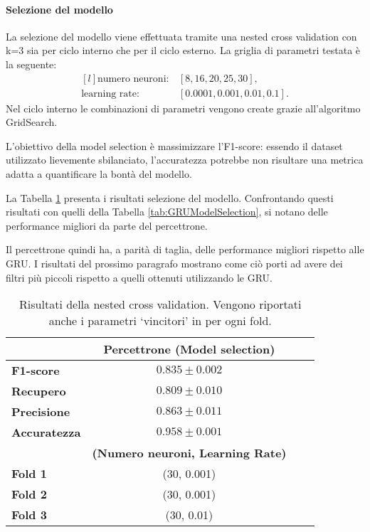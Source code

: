 \documentclass[../../main.tex]{subfiles}
\begin{document}
    \paragraph{Selezione del modello}

    La selezione del modello viene effettuata tramite una nested cross validation con k=3 sia per ciclo interno che per il ciclo esterno. La griglia di parametri testata è la seguente:
    \[
    \begin{matrix*}[l]
        \text{numero neuroni}: & [8, 16, 20, 25, 30],\\
        \text{learning rate}: & [0.0001, 0.001, 0.01, 0.1].
    \end{matrix*}
    \]
    Nel ciclo interno le combinazioni di parametri vengono create grazie all'algoritmo GridSearch.

    L'obiettivo della model selection è massimizzare l'F1-score: essendo il dataset utilizzato lievemente sbilanciato, l'accuratezza potrebbe non risultare una metrica adatta a quantificare la bontà del modello.
    
    La Tabella \ref{tab:modelSelection} presenta i risultati selezione del modello. Confrontando questi risultati con quelli della Tabella \ref{tab:GRUModelSelection}, si notano delle performance migliori da parte del percettrone. 
    
    Il percettrone quindi ha, a parità di taglia, delle performance migliori rispetto alle GRU. I risultati del prossimo paragrafo mostrano come ciò porti ad avere dei filtri più piccoli rispetto a quelli ottenuti utilizzando le GRU.
    \begin{table}[H]
        \centering                  
        \begin{tabular}{lccc}
            \toprule
            {}  &   \textbf{Percettrone (Model selection)}\\
            \midrule
            \textbf{F1-score }      &    $0.835 \pm 0.002$ \\
            \textbf{Recupero   }    &    $0.809 \pm 0.010$ \\
            \textbf{Precisione }    &    $0.863 \pm 0.011$ \\
            \textbf{Accuratezza }   &    $0.958 \pm 0.001$ \\
            \midrule
            {} & \textbf{(Numero neuroni, Learning Rate)}\\
            \midrule
            \textbf{Fold 1} &   (30, 0.001)\\ 
            \textbf{Fold 2} &   (30, 0.001)\\
            \textbf{Fold 3} &   (30, 0.01)\\
            \bottomrule
        \end{tabular}
        \caption{Risultati della nested cross validation. Vengono riportati anche i parametri `vincitori' in per ogni fold.}
        \label{tab:modelSelection}
    \end{table}
\end{document}
